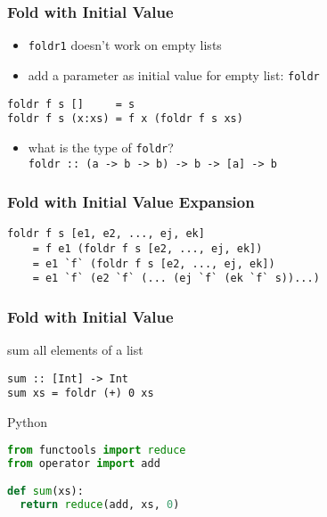 \documentclass[dvipsnames]{beamer}
\theoremstyle{plain}
\begin{document}
\begin{frame}[fragile]
  \frametitle{Fold with Initial Value}

  \begin{itemize}
    \item \lstinline|foldr1| doesn't work on empty lists
    \item add a parameter as initial value for empty list:
      \lstinline|foldr|
  \end{itemize}

  \begin{exampleblock}{}
    \begin{lstlisting}[deletekeywords={foldr}]
foldr f s []     = s
foldr f s (x:xs) = f x (foldr f s xs)
    \end{lstlisting}

    \pause
    \medskip
    \begin{itemize}
      \item what is the type of \lstinline|foldr|?\\
      \lstinline|foldr :: (a -> b -> b) -> b -> [a] -> b|
    \end{itemize}
  \end{exampleblock}
\end{frame}

\begin{frame}[fragile]
  \frametitle{Fold with Initial Value Expansion}

  \begin{block}{}
    \begin{lstlisting}
foldr f s [e1, e2, ..., ej, ek]
    = f e1 (foldr f s [e2, ..., ej, ek])
    = e1 `f` (foldr f s [e2, ..., ej, ek])
    = e1 `f` (e2 `f` (... (ej `f` (ek `f` s))...)
    \end{lstlisting}
  \end{block}
\end{frame}

\begin{frame}[fragile]
  \frametitle{Fold with Initial Value}

  \begin{exampleblock}{sum all elements of a list}
    \begin{lstlisting}[deletekeywords={sum}]
sum :: [Int] -> Int
sum xs = foldr (+) 0 xs
    \end{lstlisting}
  \end{exampleblock}

  \bigskip
  \begin{exampleblock}{Python}
    \begin{lstlisting}[language=Python, deletekeywords={reduce, sum}]
from functools import reduce
from operator import add

def sum(xs):
  return reduce(add, xs, 0)
    \end{lstlisting}
  \end{exampleblock}
\end{frame}
\end{document}
